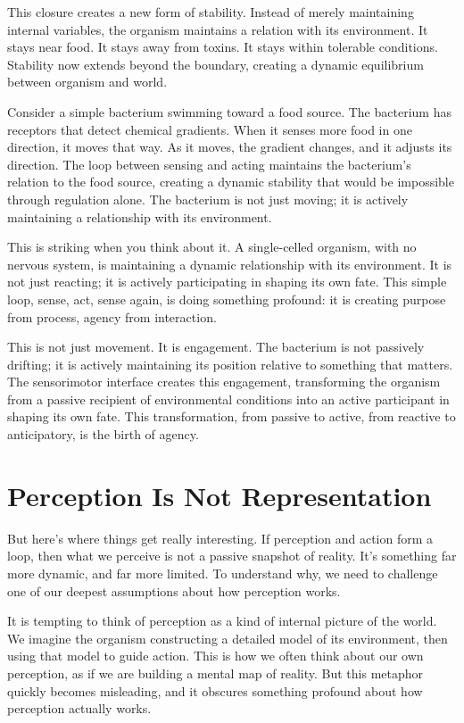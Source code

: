 \documentclass[
  openright]{book}
\begin{document}
This closure creates a new form of stability. Instead of merely
maintaining internal variables, the organism maintains a relation with
its environment. It stays near food. It stays away from toxins. It stays
within tolerable conditions. Stability now extends beyond the boundary,
creating a dynamic equilibrium between organism and world.

Consider a simple bacterium swimming toward a food source. The bacterium
has receptors that detect chemical gradients. When it senses more food
in one direction, it moves that way. As it moves, the gradient changes,
and it adjusts its direction. The loop between sensing and acting
maintains the bacterium's relation to the food source, creating a
dynamic stability that would be impossible through regulation alone. The
bacterium is not just moving; it is actively maintaining a relationship
with its environment.

This is striking when you think about it. A single-celled organism, with
no nervous system, is maintaining a dynamic relationship with its
environment. It is not just reacting; it is actively participating in
shaping its own fate. This simple loop, sense, act, sense again, is
doing something profound: it is creating purpose from process, agency
from interaction.

This is not just movement. It is engagement. The bacterium is not
passively drifting; it is actively maintaining its position relative to
something that matters. The sensorimotor interface creates this
engagement, transforming the organism from a passive recipient of
environmental conditions into an active participant in shaping its own
fate. This transformation, from passive to active, from reactive to
anticipatory, is the birth of agency.

\section{Perception Is Not
Representation}\label{perception-is-not-representation}

But here's where things get really interesting. If perception and action
form a loop, then what we perceive is not a passive snapshot of reality.
It's something far more dynamic, and far more limited. To understand
why, we need to challenge one of our deepest assumptions about how
perception works.

It is tempting to think of perception as a kind of internal picture of
the world. We imagine the organism constructing a detailed model of its
environment, then using that model to guide action. This is how we often
think about our own perception, as if we are building a mental map of
reality. But this metaphor quickly becomes misleading, and it obscures
something profound about how perception actually works.
\end{document}
